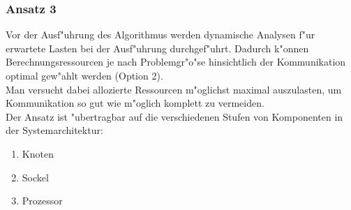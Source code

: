 \subsubsection{Ansatz 3}
Vor der Ausf"uhrung des Algorithmus werden dynamische Analysen f"ur erwartete Lasten bei der Ausf"uhrung durchgef"uhrt. Dadurch k"onnen Berechnungsressourcen je nach Problemgr"o"se hinsichtlich der Kommunikation optimal gew"ahlt werden (Option 2).\\
Man versucht dabei allozierte Ressourcen m"oglichst maximal auszulasten, um Kommunikation so gut wie m"oglich komplett zu vermeiden.\\
Der Ansatz ist "ubertragbar auf die verschiedenen Stufen von Komponenten in der Systemarchitektur:
\begin{enumerate}
	\item Knoten
	\item Sockel
	\item Prozessor
\end{enumerate}


